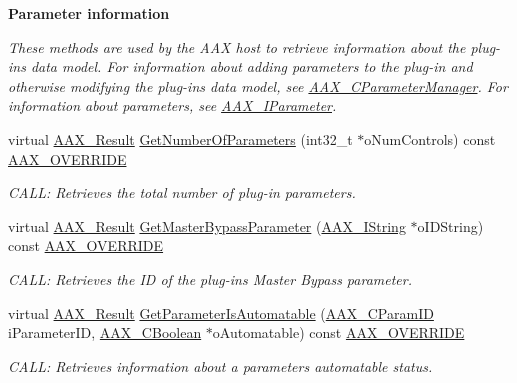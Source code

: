 \begin{Indent}{\bf Parameter information}\par
{\em These methods are used by the A\+A\+X host to retrieve information about the plug-\/in\textquotesingle{}s data model. For information about adding parameters to the plug-\/in and otherwise modifying the plug-\/in\textquotesingle{}s data model, see \hyperlink{a00034}{A\+A\+X\+\_\+\+C\+Parameter\+Manager}. For information about parameters, see \hyperlink{a00108}{A\+A\+X\+\_\+\+I\+Parameter}. }\begin{DoxyCompactItemize}
\item 
virtual \hyperlink{a00149_a4d8f69a697df7f70c3a8e9b8ee130d2f}{A\+A\+X\+\_\+\+Result} \hyperlink{a00018_ac14b0cce50da5f84113eb733ea0152e0}{Get\+Number\+Of\+Parameters} (int32\+\_\+t $\ast$o\+Num\+Controls) const \hyperlink{a00149_ac2f24a5172689ae684344abdcce55463}{A\+A\+X\+\_\+\+O\+V\+E\+R\+R\+I\+D\+E}
\begin{DoxyCompactList}\small\item\em C\+A\+L\+L\+: Retrieves the total number of plug-\/in parameters. \end{DoxyCompactList}\item 
virtual \hyperlink{a00149_a4d8f69a697df7f70c3a8e9b8ee130d2f}{A\+A\+X\+\_\+\+Result} \hyperlink{a00018_a607f91328cfc175cda2d339807a9c7cf}{Get\+Master\+Bypass\+Parameter} (\hyperlink{a00113}{A\+A\+X\+\_\+\+I\+String} $\ast$o\+I\+D\+String) const \hyperlink{a00149_ac2f24a5172689ae684344abdcce55463}{A\+A\+X\+\_\+\+O\+V\+E\+R\+R\+I\+D\+E}
\begin{DoxyCompactList}\small\item\em C\+A\+L\+L\+: Retrieves the I\+D of the plug-\/in\textquotesingle{}s Master Bypass parameter. \end{DoxyCompactList}\item 
virtual \hyperlink{a00149_a4d8f69a697df7f70c3a8e9b8ee130d2f}{A\+A\+X\+\_\+\+Result} \hyperlink{a00018_a55ef1ec4a29ac0fa92b3b3a7883ae927}{Get\+Parameter\+Is\+Automatable} (\hyperlink{a00149_a1440c756fe5cb158b78193b2fc1780d1}{A\+A\+X\+\_\+\+C\+Param\+I\+D} i\+Parameter\+I\+D, \hyperlink{a00149_aa216506530f1d19a2965931ced2b274b}{A\+A\+X\+\_\+\+C\+Boolean} $\ast$o\+Automatable) const \hyperlink{a00149_ac2f24a5172689ae684344abdcce55463}{A\+A\+X\+\_\+\+O\+V\+E\+R\+R\+I\+D\+E}
\begin{DoxyCompactList}\small\item\em C\+A\+L\+L\+: Retrieves information about a parameter\textquotesingle{}s automatable status. \end{DoxyCompactList}\item 

\end{DoxyCompactItemize}
\end{Indent}
